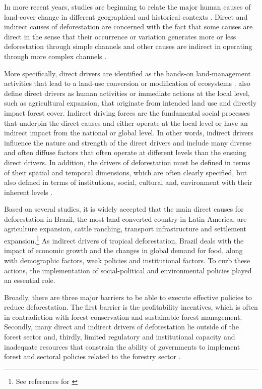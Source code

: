 In more recent years, studies are beginning to relate the major human causes of land-cover change in different geographical and historical contexts \citep{GEIST}. Direct and indirect causes of deforestation are concerned with the fact that some causes are direct in the sense that their occurrence or variation generates more or less deforestation through simple channels and other causes are indirect in operating through more complex channels \citep{MOTEL}. 

More specifically, direct drivers are identified as the hands-on land-management activities that  lead to a land-use conversion or modification of ecosystems \citep{LEEMANS}. \citet*{GEIST2} also define direct drivers as human activities or immediate actions at the local level, such as agricultural expansion, that originate from intended land use and directly impact forest cover. Indirect driving forces are the fundamental social processes that underpin the direct causes and either operate at the local level or have an indirect impact from the national or global level. In other words, indirect drivers influence the nature and strength of the direct drivers and include many diverse and often diffuse factors that often operate at different levels than the ensuing direct drivers. In addition, the drivers of deforestation must be defined in terms of their spatial and temporal dimensions, which are often clearly specified, but also defined in terms of institutions, social, cultural and, environment with their inherent levels \citep{LEEMANS}.

Based on several studies, it is widely accepted that the main direct causes for deforestation in Brazil, the most land converted country in Latin America, are agriculture expansion, cattle ranching, transport infrastructure and settlement expansion.\footnote{See references for \citet{culas11, GEIST, GEIST2, LAMBIN2,RICHARDS,RICHARDS2,CARR2,CABRAL,IMORI,DAVALOS,MOLINA,VALENTIM,PFAFF,PFAFF2,PFAFF3,KUIK,COE,SOLER,ZAMBRANO,NEPSTAD,HAMMIG,ARIMA,ARAUJO,VEIGA,BARRETTO,FARELLA,BARNI,CALDAS,COSTA,PATZ}} As indirect drivers of tropical deforestation, Brazil deals with the impact of economic growth and the changes in global demand for food, along with demographic factors, weak policies and institutional factors. To curb these actions, the implementation of social-political and environmental policies played an essential role.

Broadly, there are three major barriers to be able to execute effective policies to reduce deforestation. The first barrier is the profitability incentives, which is often in contradiction with forest conservation and sustainable forest management. Secondly, many direct and indirect drivers of deforestation lie outside of the forest sector and, thirdly, limited regulatory and institutional capacity and inadequate resources that constrain the ability of governments to implement forest and sectoral policies related to the forestry sector \citep{TACCONI,GEROLD,FAO3}. 

